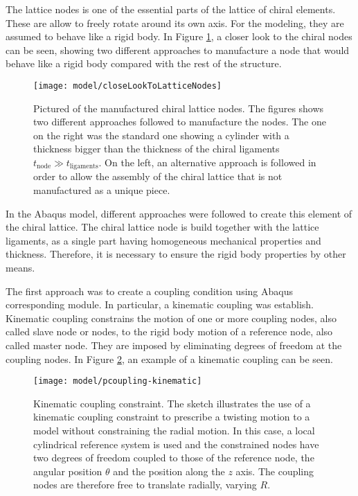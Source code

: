 The lattice nodes is one of the essential parts of the lattice of chiral elements. These are allow to freely rotate around its own axis. For the modeling, they are assumed to behave like a rigid body. In Figure \ref{fig:closeLookToLatticeNodes}, a closer look to the chiral nodes can be seen, showing two different approaches to manufacture a node that would behave like a rigid body compared with the rest of the structure.

\begin{figure}[!htpb]
  \centering
  \texttt{[image: model/closeLookToLatticeNodes]}
  \caption[Pictured of the manufactured chiral lattice nodes]{Pictured of the manufactured chiral lattice nodes. The figures shows two different approaches followed to manufacture the nodes. The one on the right was the standard one showing a cylinder with a thickness bigger than the thickness of the chiral ligaments $t_{\mathrm{node}} \gg t_{\mathrm{ligaments}}$. On the left, an alternative approach is followed in order to allow the assembly of the chiral lattice that is not manufactured as a unique piece. \cite{Vincenz2017}}\label{fig:closeLookToLatticeNodes}
\end{figure}

In the Abaqus model, different approaches were followed to create this element of the chiral lattice. The chiral lattice node is build together with the lattice ligaments, as a single part having homogeneous mechanical properties and thickness. Therefore, it is necessary to ensure the rigid body properties by other means.

The first approach was to create a coupling condition using Abaqus corresponding module. In particular, a kinematic coupling was establish. Kinematic coupling constrains the motion of one or more coupling nodes, also called slave node or nodes, to the rigid body motion of a reference node, also called master node. They are imposed by eliminating degrees of freedom at the coupling nodes. In Figure \ref{fig:kinematicCoupling}, an example of a kinematic coupling can be seen.

\begin{figure}[!htpb]
  \centering
  \texttt{[image: model/pcoupling-kinematic]}
  \caption[Kinematic coupling constraint]{Kinematic coupling constraint. The sketch illustrates the use of a kinematic coupling constraint to prescribe a twisting motion to a model without constraining the radial motion. In this case, a local cylindrical reference system is used and the constrained nodes have two degrees of freedom coupled to those of the reference node, the angular position $\theta$ and the position along the $z$ axis. The coupling nodes are therefore free to translate radially, varying $R$. \cite{Abaqus}}\label{fig:kinematicCoupling}
\end{figure}

